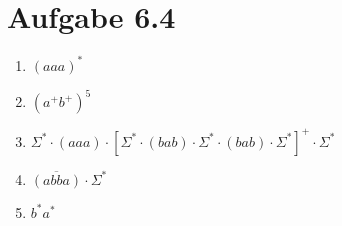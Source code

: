 \documentclass{article}
\begin{document}
	\section*{Aufgabe 6.4}
	
	\begin{enumerate}[label=(\alph*)]
		\item $(aaa)^\ast$
		\item $(a^+b^+)^5$
		\item $\Sigma^\ast\cdot (aaa)\cdot [\Sigma^\ast\cdot (bab)\cdot\Sigma^\ast\cdot (bab)\cdot\Sigma^\ast]^+\cdot \Sigma^\ast$
		\item $\overline{(abba)}\cdot\Sigma^\ast$
		\item $b^\ast a^\ast$
	\end{enumerate}
\end{document}
